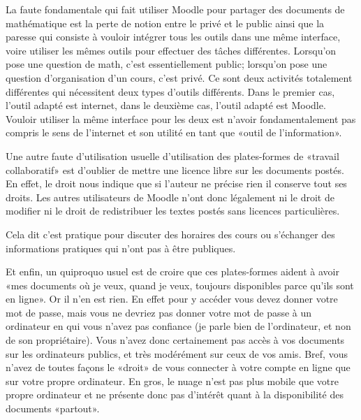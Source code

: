 La faute fondamentale qui fait utiliser Moodle pour partager des documents de mathématique est la perte de notion entre le privé et le public ainsi que la paresse qui consiste à vouloir intégrer tous les outils dans une même interface, voire utiliser les mêmes outils pour effectuer des tâches différentes. Lorsqu'on pose une question de math, c'est essentiellement public; lorsqu'on pose une question d'organisation d'un cours, c'est privé. Ce sont deux activités totalement différentes qui nécessitent deux types d'outils différents. Dans le premier cas, l'outil adapté est internet, dans le deuxième cas, l'outil adapté est Moodle. Vouloir utiliser la même interface pour les deux est n'avoir fondamentalement pas compris le sens de l'internet et son utilité en tant que «outil de l'information».

Une autre faute d'utilisation usuelle d'utilisation des plates-formes de «travail collaboratif» est d'oublier de mettre une licence libre sur les documents postés. En effet, le droit nous indique que si l'auteur ne précise rien il conserve tout ses droits. Les autres utilisateurs de Moodle n'ont donc légalement ni le droit de modifier ni le droit de redistribuer les textes postés sans licences particulières.

{\tiny Cela dit c'est pratique pour discuter des horaires des cours ou s'échanger des informations pratiques qui n'ont pas à être publiques.}

Et enfin, un quiproquo usuel est de croire que ces plates-formes aident à avoir «mes documents où je veux, quand je veux, toujours disponibles parce qu'ils sont en ligne». Or il n'en est rien. En effet pour y accéder vous devez donner votre mot de passe, mais vous ne devriez pas donner votre mot de passe à un ordinateur en qui vous n'avez pas confiance (je parle bien de l'ordinateur, et non de son propriétaire). Vous n'avez donc certainement pas accès à vos documents sur les ordinateurs publics, et très modérément sur ceux de vos amis. Bref, vous n'avez de toutes façons le «droit» de vous connecter à votre compte en ligne que sur votre propre ordinateur. En gros, le nuage n'est pas plus mobile que votre propre ordinateur et ne présente donc pas d'intérêt quant à la disponibilité des documents «partout».

